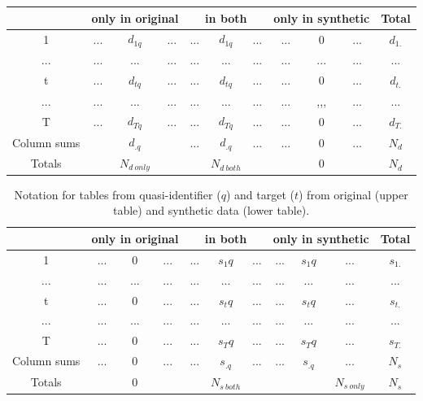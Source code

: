 \documentclass[12pt]{article}
\begin{document}
\begin{center}
\begin{table}[ht]
\begin{tabular}{ c|ccc|ccc|ccc|c} 
 &  \multicolumn{3}{|c|}{only in original} & \multicolumn{3}{|c|}{in both} & \multicolumn{3}{|c|}{only in synthetic} & Total\\
  \hline
1    & ... & $d_{1q}$  & ...   & ... & $d_{1q}$  & ...   & ... & 0 & ...  & $d_{1.}$ \\
 ... & ... & ...  & ...   & ... & ... & ...   & ... & ... & ...  & ... \\
t   & ...  & $d_{tq}$   & ...   & ... & $d_{tq}$ & ...   & ... & 0 & ...  & $d_{t.}$  \\
... & ...  & ...  & ...   & ... & ... & ...   & ... & ,,,  & ...  & ...  \\
T   & ...  & $d_{Tq}$  & ...   & ... & $d_{Tq}$ & ...   & ... & 0 &  ... & $d_{T.}$  \\
 \hline
Column sums   &  & $d_{.q}$  &   & ... & $d_{.q}$ & ...   & ... & 0 &  ... & $N_d$ \\
 \hline
Totals   &   & $N_{d\:only}$  &    &  & $N_{d~both}$ &    &  & 0 &   & $N_d$ \\
\end{tabular}
\end{table}
\begin{table}[ht]
\begin{tabular}{ c|ccc|ccc|ccc|c} 
 &  \multicolumn{3}{|c|}{only in original} & \multicolumn{3}{|c|}{in both} & \multicolumn{3}{|c|}{only in synthetic} & Total\\
  \hline
1    & ... & 0  & ...   & ... & $s_1q$ & ...   & ... &  $s_1q$ & ...  & $s_{1.}$ \\
 ... & ... & ...  & ...   & ... & ... & ...   & ... & ... & ...  & ... \\
t   & ...  & 0  & ...   & ... & $s_tq$  & ...   & ... &  $s_tq$ & ...  & $s_{t.}$ \\
... & ...  & ...  & ...   & ... & ... & ...   & ... & ... & ...  & ...  \\
T   & ...  & 0  & ...   & ... & $s_Tq$  & ...   & ... & $s_Tq$ &  ... & $s_{T.}$ \\
 \hline
Column sums   & ...  & 0  & ...   & ... & $s_{.q}$ & ...   & ... & $s_{.q}$ &  ... & $N_s$ \\
 \hline
Totals   &   & 0  &    &  & $N_{s~both}$ &    &   &   & $N_{s\:only}$ & $N_s$ \\

\end{tabular}
\caption{Notation for tables from quasi-identifier ($q$) and target ($t$) from original (upper table) and synthetic data (lower table).}
\end{table}
\end{center}
\end{document}
